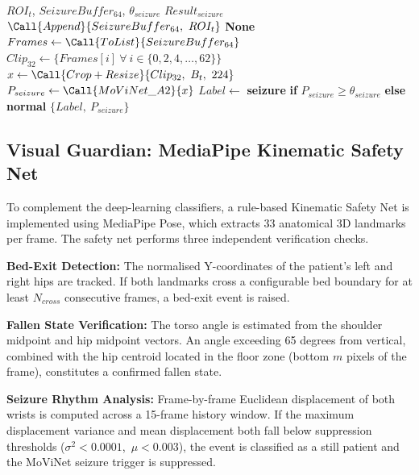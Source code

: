 \begin{algorithm}[H]
\caption{MoViNet-A2 Seizure Classification with Stride-2 Subsampling}
\label{alg:seizure}
\begin{algorithmic}[1]
\Require $ROI_t$, $SeizureBuffer_{64}$, $\theta_{seizure}$
\Ensure $Result_{seizure}$
\State $\Call{Append}{SeizureBuffer_{64},\ ROI_t}$
    \State \Return \textbf{None}
\EndIf
\State $Frames \gets \Call{ToList}{SeizureBuffer_{64}}$
\State $Clip_{32} \gets \{Frames[i]\ \forall\ i \in \{0,2,4,\ldots,62\}\}$ 
\State $x \gets \Call{Crop+Resize}{Clip_{32},\ B_t,\ 224}$
\State $P_{seizure} \gets \Call{MoViNet\_A2}{x}$
\State $Label \gets$ \textbf{seizure} \textbf{if} $P_{seizure} \geq \theta_{seizure}$ \textbf{else} \textbf{normal}
\State \Return $\{Label,\ P_{seizure}\}$
\end{algorithmic}
\end{algorithm}

\subsection{Visual Guardian: MediaPipe Kinematic Safety Net}
\label{subsec:mediapipe}

To complement the deep-learning classifiers, a rule-based Kinematic Safety Net
is implemented using MediaPipe Pose, which extracts 33 anatomical 3D landmarks
per frame. The safety net performs three independent verification checks.

\textbf{Bed-Exit Detection:} The normalised Y-coordinates of the patient's left
and right hips are tracked. If both landmarks cross a configurable bed boundary
for at least $N_{cross}$ consecutive frames, a bed-exit event is raised.

\textbf{Fallen State Verification:} The torso angle is estimated from the
shoulder midpoint and hip midpoint vectors. An angle exceeding 65 degrees from
vertical, combined with the hip centroid located in the floor zone
(bottom $m$ pixels of the frame), constitutes a confirmed fallen state.

\textbf{Seizure Rhythm Analysis:} Frame-by-frame Euclidean displacement of both
wrists is computed across a 15-frame history window. If the maximum displacement
variance and mean displacement both fall below suppression thresholds
($\sigma^2 < 0.0001$,\ $\mu < 0.003$), the event is classified as a still patient
and the MoViNet seizure trigger is suppressed.

